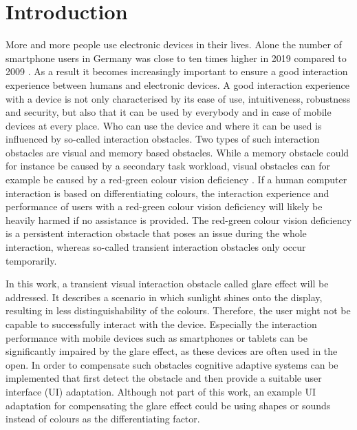 \chapter{Introduction}
\label{introduction}

More and more people use electronic devices in their lives. Alone the number of smartphone users in Germany was close to ten times higher in 2019 compared to 2009 \cite{smartphone}. As a result it becomes increasingly important to ensure a good interaction experience between humans and electronic devices. A good interaction experience with a device is not only characterised by its ease of use, intuitiveness, robustness and security, but also that it can be used by everybody and in case of mobile devices at every place. Who can use the device and where it can be used is influenced by so-called interaction obstacles. Two types of such interaction obstacles are visual and memory based obstacles. While a memory obstacle could for instance be caused by a secondary task workload, visual obstacles can for example be caused by a red-green colour vision deficiency \cite[p.~1]{blind}. If a human computer interaction is based on differentiating colours, the interaction experience and performance of users with a red-green colour vision deficiency will likely be heavily harmed if no assistance is provided. The red-green colour vision deficiency is a persistent interaction obstacle that poses an issue during the whole interaction, whereas so-called transient interaction obstacles only occur temporarily. 

In this work, a transient visual interaction obstacle called glare effect will be addressed. It describes a scenario in which sunlight shines onto the display, resulting in less distinguishability of the colours. Therefore, the user might not be capable to successfully interact with the device. Especially the interaction performance with mobile devices such as smartphones or tablets can be significantly impaired by the glare effect, as these devices are often used in the open. In order to compensate such obstacles cognitive adaptive systems can be implemented that first detect the obstacle and then provide a suitable user interface (UI) adaptation. Although not part of this work, an example UI adaptation for compensating the glare effect could be using shapes or sounds instead of colours as the differentiating factor. 

